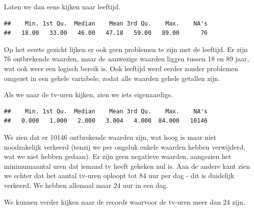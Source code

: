 \documentclass[]{tufte-book}
\newenvironment{Shaded}{}{}
\newcommand{\DecValTok}[1]{\textcolor[rgb]{0.25,0.63,0.44}{#1}}
\newcommand{\KeywordTok}[1]{\textcolor[rgb]{0.00,0.44,0.13}{\textbf{#1}}}
\newcommand{\NormalTok}[1]{#1}
\newcommand{\OperatorTok}[1]{\textcolor[rgb]{0.40,0.40,0.40}{#1}}
\newcommand{\StringTok}[1]{\textcolor[rgb]{0.25,0.44,0.63}{#1}}
\begin{document}
Laten we dan eens kijken naar leeftijd.

\begin{Shaded}
\end{Shaded}

\begin{verbatim}
##    Min. 1st Qu.  Median    Mean 3rd Qu.    Max.    NA's 
##   18.00   33.00   46.00   47.18   59.00   89.00      76
\end{verbatim}

Op het eerste gezicht lijken er ook geen problemen te zijn met de leeftijd. Er zijn 76 ontbrekende waarden, maar de aanwezige waarden liggen tussen 18 en 89 jaar, wat ook weer een logisch bereik is. Ook leeftijd werd eerder zonder problemen omgezet in een gehele variabele, zodat alle waarden gehele getallen zijn.

Als we naar de tv-uren kijken, zien we iets eigenaardigs.

\begin{Shaded}
\end{Shaded}

\begin{verbatim}
##    Min. 1st Qu.  Median    Mean 3rd Qu.    Max.    NA's 
##   0.000   1.000   2.000   3.004   4.000  84.000   10146
\end{verbatim}

We zien dat er 10146 ontbrekende waarden zijn, wat hoog is maar niet noodzakelijk verkeerd (tenzij we per ongeluk enkele waarden hebben verwijderd, wat we niet hebben gedaan). Er zijn geen negatieve waarden, aangezien het minimumaantal uren dat iemand tv heeft gekeken nul is. Aan de andere kant zien we echter dat het aantal tv-uren oploopt tot 84 uur per dag - dit is duidelijk verkeerd. We hebben allemaal maar 24 uur in een dag.

We kunnen verder kijken naar de records waarvoor de tv-uren meer dan 24 zijn.

\begin{Shaded}
\end{Shaded}
\end{document}
